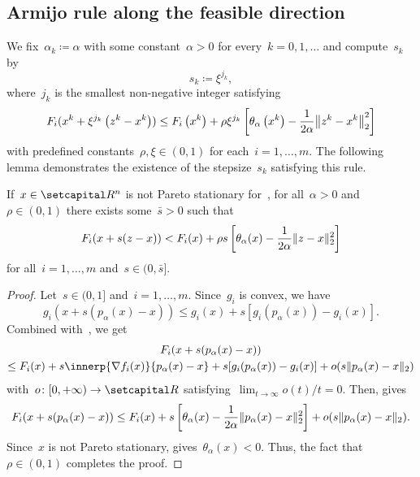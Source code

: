 \documentclass[../main]{subfiles}
\begin{document}
\subsection{Armijo rule along the feasible direction} 
We fix~$\alpha_k \coloneqq \alpha$ with some constant~$\alpha > 0$ for every~$k = 0, 1, \dots$ and compute~$s_k$ by 
\begin{equation} \label{eq:pgm_armijo_step}
    s_k \coloneqq \xi^{j_k}
,\end{equation}
where~$j_k$ is the smallest non-negative integer satisfying
\begin{equation} \label{eq:pgm_armijo_rule}
    F_i(x^k + \xi^{j_k} \left(z^k - x^k\right)) \le F_i\left(x^k\right) + \rho \xi^{j_k} \left[\theta_\alpha\left(x^k\right) - \frac{1}{2 \alpha} \norm*{z^k - x^k}_2^2\right]
\end{equation} 
with predefined constants~$\rho, \xi \in (0, 1)$ for each~$i = 1, \dots, m$.
The following lemma demonstrates the existence of the stepsize~$s_k$ satisfying this rule.
\begin{lemma} 
    If~$x \in \setR^n$ is not Pareto stationary for~, for all~$\alpha > 0$ and~$\rho \in (0, 1)$ there exists some~$\bar{s} > 0$ such that
    \begin{equation}
        F_i(x + s (z - x)) < F_i(x) + \rho s \left[\theta_\alpha(x) - \frac{1}{2 \alpha} \lVert z - x\rVert_2^2\right]
    \end{equation} 
    for all~$i = 1, \dots, m$ and~$s \in (0, \bar{s}]$.
\end{lemma}
\begin{proof}
    Let~$s \in (0, 1]$ and~$i = 1, \dots, m$.
    Since~$g_i$ is convex, we have
    \begin{equation}
        g_i(x + s (p_\alpha(x) - x)) \le g_i(x) + s [g_i(p_\alpha(x)) - g_i(x)]
    .\end{equation}
    Combined with~, we get
    \begin{multline}
        F_i(x + s (p_\alpha(x) - x)) \\
        \le F_i(x) + s \innerp{\nabla f_i(x)}{p_\alpha(x) - x} + s [g_i(p_\alpha(x)) - g_i(x)] + o(s \norm{p_\alpha(x) - x}_2)
    \end{multline}
    with~$o \colon [0, + \infty) \to \setR$ satisfying~$\lim_{t \to \infty} o(t) / t = 0$.
    Then,  gives
    \begin{equation}
        F_i(x + s (p_\alpha(x) - x)) 
        \le F_i(x) + s \left[ \theta_\alpha(x) - \frac{1}{2 \alpha} \lVert p_\alpha(x) - x\rVert_2^2 \right] + o(s \lVert p_\alpha(x) - x\rVert_2)
    .\end{equation}
    Since~$x$ is not Pareto stationary,  gives~$\theta_\alpha(x) < 0$.
    Thus, the fact that~$\rho \in (0, 1)$ completes the proof.
\end{proof}
\end{document}
